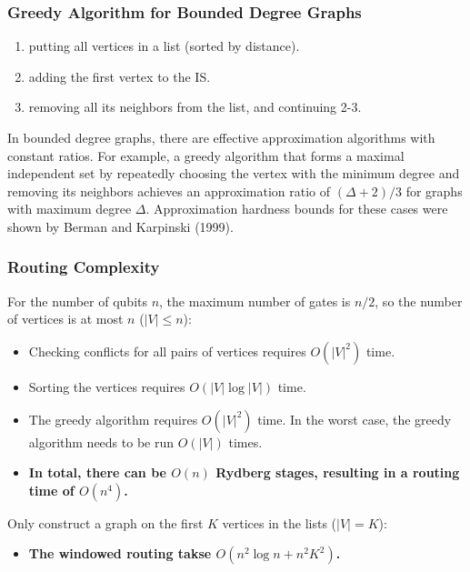 \documentclass[18 pt]{beamer}
\begin{document}
\begin{frame}
    \frametitle{Greedy Algorithm for Bounded Degree Graphs}
    \begin{enumerate}
        \item putting all vertices in a list (sorted by distance).
        \item adding the first vertex to the IS.
        \item removing all its neighbors from the list, and continuing 2-3.
    \end{enumerate}
   \begin{Theorem}
    In bounded degree graphs, there are effective approximation algorithms with constant ratios. For example, a greedy algorithm that forms a maximal independent set by repeatedly choosing the vertex with the minimum degree and removing its neighbors achieves an approximation ratio of $(\Delta + 2)/3$ for graphs with maximum degree $\Delta$. Approximation hardness bounds for these cases were shown by Berman and Karpinski (1999).
   \end{Theorem}
\end{frame}
\begin{frame}
    \frametitle{Routing Complexity}
    For the number of qubits $n$, the maximum number of gates is $n/2$, so the number of vertices is at most $n$ ($|V| \leq n$):
    \begin{itemize}
        \item Checking conflicts for all pairs of vertices requires $O(|V|^2)$ time.
        \item Sorting the vertices requires $O(|V|\log |V|)$ time.
        \item The greedy algorithm requires $O(|V|^2)$ time. In the worst case, the greedy algorithm needs to be run $O(|V|)$ times.
        \item \textbf{In total, there can be $O(n)$ Rydberg stages, resulting in a routing time of $O(n^4)$.}
    \end{itemize}
    \vspace{10pt}
    Only construct a graph on the first $K$ vertices in the lists ($|V| = K$):
    \begin{itemize}
        \item \textbf{The windowed routing takse $O(n^2\log n + n^2K^2)$.}
    \end{itemize}
\end{frame}
\end{document}
